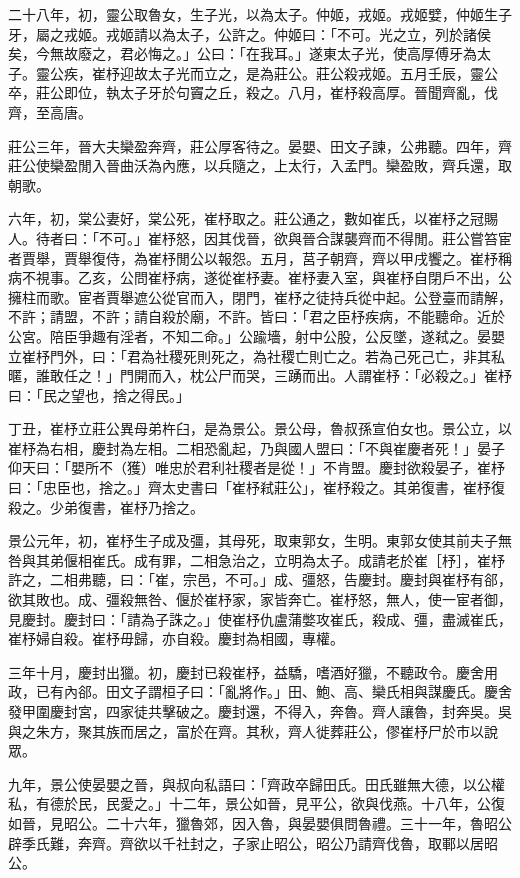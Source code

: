 \begin{pinyinscope}
二十八年，初，靈公取魯女，生子光，以為太子。仲姬，戎姬。戎姬嬖，仲姬生子牙，屬之戎姬。戎姬請以為太子，公許之。仲姬曰：「不可。光之立，列於諸侯矣，今無故廢之，君必悔之。」公曰：「在我耳。」遂東太子光，使高厚傅牙為太子。靈公疾，崔杼迎故太子光而立之，是為莊公。莊公殺戎姬。五月壬辰，靈公卒，莊公即位，執太子牙於句竇之丘，殺之。八月，崔杼殺高厚。晉聞齊亂，伐齊，至高唐。

莊公三年，晉大夫欒盈奔齊，莊公厚客待之。晏嬰、田文子諫，公弗聽。四年，齊莊公使欒盈閒入晉曲沃為內應，以兵隨之，上太行，入孟門。欒盈敗，齊兵還，取朝歌。

六年，初，棠公妻好，棠公死，崔杼取之。莊公通之，數如崔氏，以崔杼之冠賜人。待者曰：「不可。」崔杼怒，因其伐晉，欲與晉合謀襲齊而不得閒。莊公嘗笞宦者賈舉，賈舉復侍，為崔杼閒公以報怨。五月，莒子朝齊，齊以甲戌饗之。崔杼稱病不視事。乙亥，公問崔杼病，遂從崔杼妻。崔杼妻入室，與崔杼自閉戶不出，公擁柱而歌。宦者賈舉遮公從官而入，閉門，崔杼之徒持兵從中起。公登臺而請解，不許；請盟，不許；請自殺於廟，不許。皆曰：「君之臣杼疾病，不能聽命。近於公宮。陪臣爭趣有淫者，不知二命。」公踰墻，射中公股，公反墜，遂弒之。晏嬰立崔杼門外，曰：「君為社稷死則死之，為社稷亡則亡之。若為己死己亡，非其私暱，誰敢任之！」門開而入，枕公尸而哭，三踴而出。人謂崔杼：「必殺之。」崔杼曰：「民之望也，捨之得民。」

丁丑，崔杼立莊公異母弟杵臼，是為景公。景公母，魯叔孫宣伯女也。景公立，以崔杼為右相，慶封為左相。二相恐亂起，乃與國人盟曰：「不與崔慶者死！」晏子仰天曰：「嬰所不（獲）唯忠於君利社稷者是從！」不肯盟。慶封欲殺晏子，崔杼曰：「忠臣也，捨之。」齊太史書曰「崔杼弒莊公」，崔杼殺之。其弟復書，崔杼復殺之。少弟復書，崔杼乃捨之。

景公元年，初，崔杼生子成及彊，其母死，取東郭女，生明。東郭女使其前夫子無咎與其弟偃相崔氏。成有罪，二相急治之，立明為太子。成請老於崔［杼］，崔杼許之，二相弗聽，曰：「崔，宗邑，不可。」成、彊怒，告慶封。慶封與崔杼有郤，欲其敗也。成、彊殺無咎、偃於崔杼家，家皆奔亡。崔杼怒，無人，使一宦者御，見慶封。慶封曰：「請為子誅之。」使崔杼仇盧蒲嫳攻崔氏，殺成、彊，盡滅崔氏，崔杼婦自殺。崔杼毋歸，亦自殺。慶封為相國，專權。

三年十月，慶封出獵。初，慶封已殺崔杼，益驕，嗜酒好獵，不聽政令。慶舍用政，已有內郤。田文子謂桓子曰：「亂將作。」田、鮑、高、欒氏相與謀慶氏。慶舍發甲圍慶封宮，四家徒共擊破之。慶封還，不得入，奔魯。齊人讓魯，封奔吳。吳與之朱方，聚其族而居之，富於在齊。其秋，齊人徙葬莊公，僇崔杼尸於市以說眾。

九年，景公使晏嬰之晉，與叔向私語曰：「齊政卒歸田氏。田氏雖無大德，以公權私，有德於民，民愛之。」十二年，景公如晉，見平公，欲與伐燕。十八年，公復如晉，見昭公。二十六年，獵魯郊，因入魯，與晏嬰俱問魯禮。三十一年，魯昭公辟季氏難，奔齊。齊欲以千社封之，子家止昭公，昭公乃請齊伐魯，取鄆以居昭公。


\end{pinyinscope}

